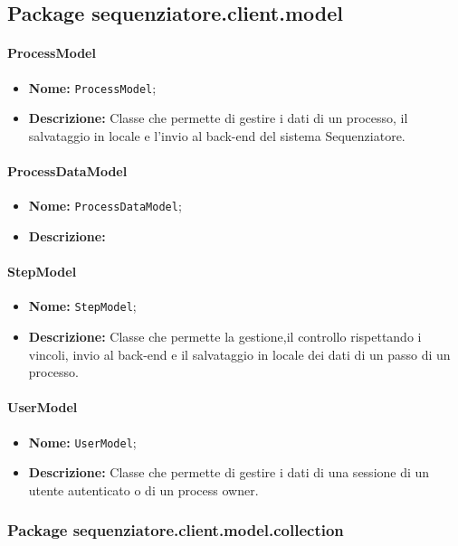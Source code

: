 \subsection{Package sequenziatore.client.model}

\paragraph{ProcessModel}
\begin{itemize}
\item \textbf{Nome:} \texttt{ProcessModel};
\item \textbf{Descrizione:} Classe che permette di gestire i dati di un processo, il salvataggio in locale e l'invio al back-end del sistema Sequenziatore.
\end{itemize}

\paragraph{ProcessDataModel}
\begin{itemize}
\item \textbf{Nome:} \texttt{ProcessDataModel};
\item \textbf{Descrizione:}
\end{itemize}

\paragraph{StepModel}
\begin{itemize}
\item \textbf{Nome:} \texttt{StepModel};
\item \textbf{Descrizione:} Classe che permette la gestione,il controllo rispettando i vincoli, invio al back-end e il salvataggio in locale dei dati di un passo di un processo.
\end{itemize}

\paragraph{UserModel}
\begin{itemize}
\item \textbf{Nome:} \texttt{UserModel};
\item \textbf{Descrizione:} Classe che permette di gestire i dati di una sessione di un utente autenticato o di un process owner.
\end{itemize}

\subsubsection{Package sequenziatore.client.model.collection}


